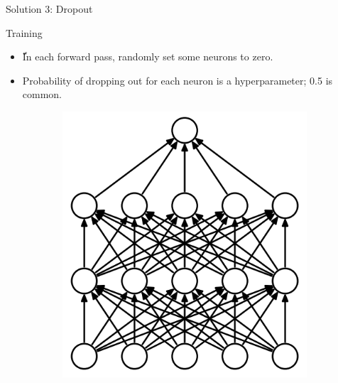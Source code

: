 \begin{frame}{Solution 3: Dropout}
	\begin{block}{Training}
		\begin{itemize}
			\item ّIn each forward pass, randomly set some neurons to zero.
			\item Probability of dropping out for each neuron is a hyperparameter; 0.5 is common.
		\end{itemize}
		
		\begin{figure}[H]
			\centering
			\begin{subfigure}[b]{0.45\textwidth}
				\centering
				\includegraphics[height=0.4\textheight]{Figs/Dropout-before.png}
			\end{subfigure}
			\begin{subfigure}[b]{0.45\textwidth}
				\centering

\end{subfigure}
\end{figure}
\end{block}
\end{frame}
